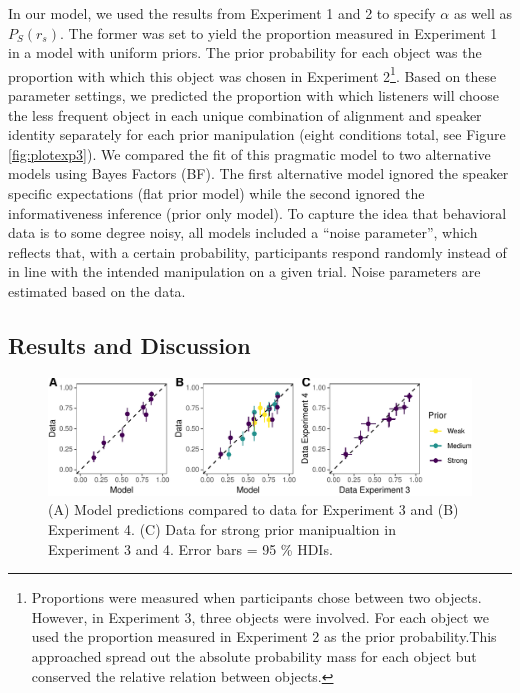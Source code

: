 \documentclass[10pt, letterpaper]{article}
\newenvironment{CodeChunk}{}{}
\begin{document}
In our model, we used the results from Experiment 1 and 2 to specify
\(\alpha\) as well as \(P_S(r_s)\). The former was set to yield the
proportion measured in Experiment 1 in a model with uniform priors. The
prior probability for each object was the proportion with which this
object was chosen in Experiment
2\footnote{Proportions were measured when participants chose between two objects. However, in Experiment 3, three objects were involved. For each object we used the proportion measured in Experiment 2 as the prior probability.This approached spread out the absolute probability mass for each object but conserved the relative relation between objects.}.
Based on these parameter settings, we predicted the proportion with
which listeners will choose the less frequent object in each unique
combination of alignment and speaker identity separately for each prior
manipulation (eight conditions total, see Figure \ref{fig:plotexp3}). We
compared the fit of this pragmatic model to two alternative models using
Bayes Factors (BF). The first alternative model ignored the speaker
specific expectations (flat prior model) while the second ignored the
informativeness inference (prior only model). To capture the idea that
behavioral data is to some degree noisy, all models included a ``noise
parameter'', which reflects that, with a certain probability,
participants respond randomly instead of in line with the intended
manipulation on a given trial. Noise parameters are estimated based on
the data.

\subsection{Results and Discussion}\label{results-and-discussion-2}

\begin{CodeChunk}
\begin{figure}[h]

{\centering \includegraphics{figs/plotmodelcomp-1} 

}

\caption[(A) Model predictions compared to data for Experiment 3 and (B) Experiment 4]{(A) Model predictions compared to data for Experiment 3 and (B) Experiment 4. (C) Data for strong prior manipualtion in Experiment 3 and 4. Error bars = 95 \%  HDIs.}\label{fig:plotmodelcomp}
\end{figure}
\end{CodeChunk}
\end{document}
